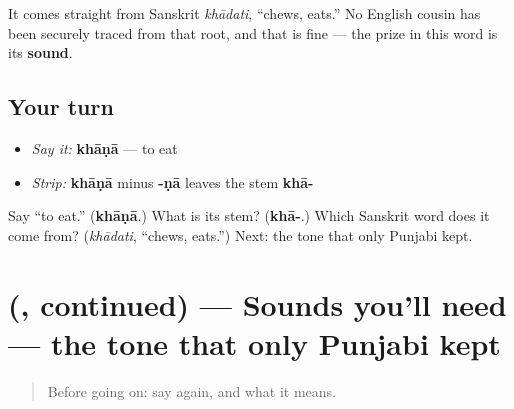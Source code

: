 It comes straight from Sanskrit \emph{khādati}, “chews, eats.” No English cousin has been securely traced from that root, and that is fine — the prize in this word is its \textbf{sound}.

\subsection*{Your turn}
\begin{itemize}
\raggedright
  \item \emph{Say it:} \textbf{khāṇā} — to eat
  \item \emph{Strip:} \textbf{khāṇā} minus \textbf{-ṇā} leaves the stem \textbf{khā-}
\end{itemize}

\begin{tcolorbox}[breakable,colback=teal!4,colframe=teal!35!black,title={Before you move on}]
Say \textquotedblleft{}to eat.\textquotedblright{} (\textbf{khāṇā}.) What is its stem? (\textbf{khā-}.) Which Sanskrit word does it come from? (\emph{khādati}, \textquotedblleft{}chews, eats.\textquotedblright{}) Next: the tone that only Punjabi kept.
\end{tcolorbox}
\section[\texorpdfstring{(\pa{ਖਾਣਾ}, continued)}{(ਖਾਣਾ, continued)}]{(, continued) — Sounds you'll need — the tone that only Punjabi kept}

\label{lesson:PA-C07-khana-tone}



\begin{quote}
Before going on: say \textbf{} again, and what it means.
\end{quote}

